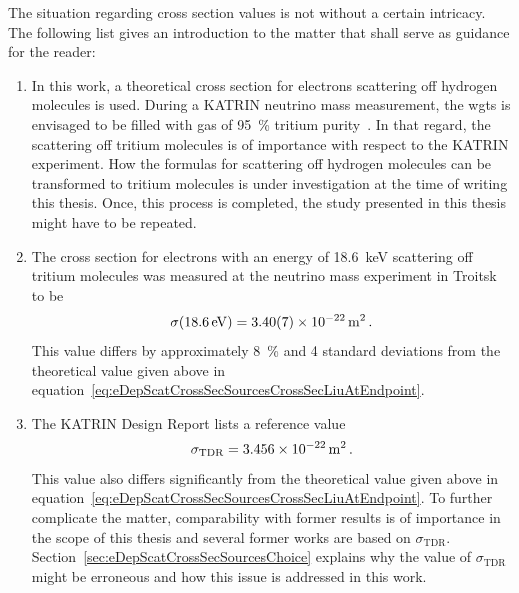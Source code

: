 The situation regarding cross section values is not without a certain intricacy. The following list gives an introduction to the matter that shall serve as guidance for the reader:\mynobreakpar
\begin{enumerate}
	\item In this work, a theoretical cross section for electrons scattering off hydrogen molecules is used. During a KATRIN neutrino mass measurement, the \gls{wgts} is envisaged to be filled with gas of \SI{95}{\percent} tritium purity~\cite{Angrik:2005ep}. In that regard, the scattering off tritium molecules is of importance with respect to the KATRIN experiment. How the formulas for scattering off hydrogen molecules can be transformed to tritium molecules is under investigation at the time of writing this thesis. Once, this process is completed, the study presented in this thesis might have to be repeated.
	\item The cross section for electrons with an energy of \SI{18.6}{keV} scattering off tritium molecules was measured at the neutrino mass experiment in Troitsk to be~\cite{Aseev2000}
	\begin{equation}
		\sigma(\SI{18.6}{eV}) = \SI{3.40\pm0.07e-22}{m^2}
		\fullstop
	\end{equation}
	This value differs by approximately \SI{8}{\percent} and 4 standard deviations from the theoretical value given above in equation~\eqref{eq:eDepScatCrossSecSourcesCrossSecLiuAtEndpoint}.
	\item The KATRIN Design Report lists a reference value~\cite{Angrik:2005ep}
	\begin{equation}
	\label{eq:eDepScatCrossSecSourcesCrossSecTDR}
	\sigma_\mathrm{TDR} = \SI{3.456e-22}{m^2}
	\fullstop
	\end{equation}
	This value also differs significantly from the theoretical value given above in equation~\eqref{eq:eDepScatCrossSecSourcesCrossSecLiuAtEndpoint}. To further complicate the matter, comparability with former results is of importance in the scope of this thesis and several former works are based on $\sigma_\mathrm{TDR}$. Section~\ref{sec:eDepScatCrossSecSourcesChoice} explains why the value of $\sigma_\mathrm{TDR}$ might be erroneous and how this issue is addressed in this work.
\end{enumerate}

